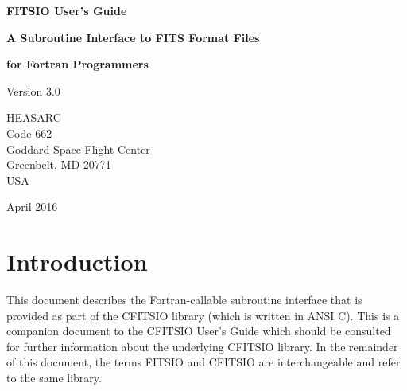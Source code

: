 \documentclass[11pt]{book}
\begin{document}

\begin{titlepage}
\normalsize
\vspace*{4.6cm}
\begin{center}
{\Huge \bf FITSIO User's Guide}\\
\end{center}
\medskip 
\medskip
\begin{center}
{\LARGE \bf A Subroutine Interface to FITS Format Files}\\
\end{center}
\begin{center}
{\LARGE \bf for Fortran Programmers}\\
\end{center}
\medskip
\medskip
\begin{center}
{\Large Version 3.0\\}
\end{center}
\bigskip
\vskip 2.5cm
\begin{center}
{HEASARC\\
Code 662\\
Goddard Space Flight Center\\
Greenbelt, MD 20771\\
USA}
\end{center}

\vfill
\bigskip
\begin{center}
{\Large April 2016\\}
\end{center}
\vfill
\end{titlepage}

\clearpage

\tableofcontents

\chapter{Introduction }

This document describes the Fortran-callable subroutine interface that
is provided as part of the CFITSIO library (which is written in ANSI
C).  This is a companion document to the CFITSIO User's Guide which
should be consulted for further information about the underlying
CFITSIO library.  In the remainder of this document, the terms FITSIO
and CFITSIO are interchangeable and refer to the same library.
\end{document}
